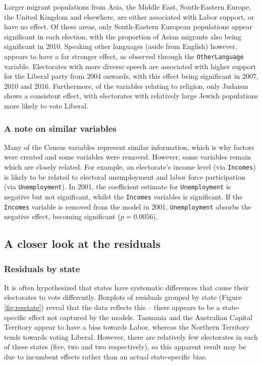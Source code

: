 \documentclass[11pt,a4paper,]{article}
\begin{document}
Larger migrant populations from Asia, the Middle East, South-Eastern
Europe, the United Kingdom and elsewhere, are either associated with
Labor support, or have no effect. Of these areas, only South-Eastern
European populations appear significant in each election, with the
proportion of Asian migrants also being significant in 2010. Speaking
other languages (aside from English) however, appears to have a far
stronger effect, as observed through the \texttt{OtherLanguage}
variable. Electorates with more diverse speech are associated with
higher support for the Liberal party from 2004 onwards, with this effect
being significant in 2007, 2010 and 2016. Furthermore, of the variables
relating to religion, only Judaism shows a consistent effect, with
electorates with relatively large Jewish populations more likely to vote
Liberal.

\subsubsection{A note on similar
variables}\label{a-note-on-similar-variables}

Many of the Census variables represent similar information, which is why
factors were created and some variables were removed. However, some
variables remain which are closely related. For example, an electorate's
income level (via \texttt{Incomes}) is likely to be related to electoral
unemployment and labor force participation (via \texttt{Unemployment}).
In 2001, the coefficient estimate for \texttt{Unemployment} is negative
but not significant, whilst the \texttt{Incomes} variables is
significant. If the \texttt{Incomes} variable is removed from the model
in 2001, \texttt{Unemployment} absorbs the negative effect, becoming
significant (\(p = 0.0056\)).

\subsection{A closer look at the
residuals}\label{a-closer-look-at-the-residuals}

\subsubsection{Residuals by state}\label{residuals-by-state}

It is often hypothesized that states have systematic differences that
cause their electorates to vote differently. Boxplots of residuals
grouped by state (Figure \ref{fig:resstate}) reveal that the data
reflects this -- there appears to be a state-specific effect not
captured by the models. Tasmania and the Australian Capital Territory
appear to have a bias towards Labor, whereas the Northern Territory
tends towards voting Liberal. However, there are relatively few
electorates in each of these states (five, two and two respectively), so
this apparent result may be due to incumbent effects rather than an
actual state-specific bias.
\end{document}
